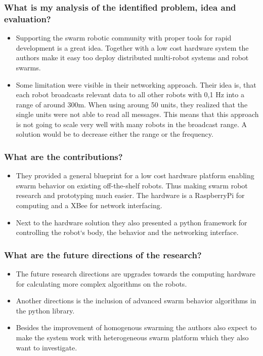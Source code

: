 \subsubsection*{What is my analysis of the identified problem, idea and evaluation?}
\begin{itemize}
    \item Supporting the swarm robotic community with proper tools for rapid development is a great idea. Together with a low cost hardware system the authors make it easy too deploy distributed multi-robot systems and robot swarms.
    \item Some limitation were visible in their networking approach. Their idea is, that each robot broadcasts relevant data to all other robots with 0,1 Hz into a range of around 300m. When using aroung 50 units, they realized that the single units were not able to read all messages. This means that this approach is not going to scale very well with many robots in the broadcast range. A solution would be to decrease either the range or the frequency.
\end{itemize}
\subsubsection*{What are the contributions?}
\begin{itemize}
    \item They provided a general blueprint for a low cost hardware platform enabling swarm behavior on existing off-the-shelf robots. Thus making swarm robot research and prototyping much easier. The hardware is a RaspberryPi for computing and a XBee for network interfacing.
    \item Next to the hardware solution they also presented a python framework for controlling the robot`s body, the behavior and the networking interface.
\end{itemize}
\subsubsection*{What are the future directions of the research?}
\begin{itemize}
    \item The future research directions are upgrades towards the computing hardware for calculating more complex algorithms on the robots. 
    \item Another directions is the inclusion of advanced swarm behavior algorithms in the python library.
    \item Besides the improvement of homogenous swarming the authors also expect to make the system work with heterogeneous swarm platform which they also want to investigate.
\end{itemize}
